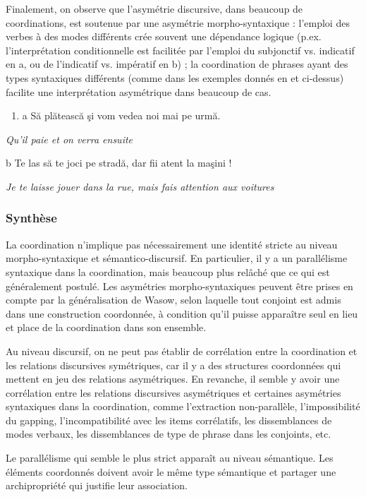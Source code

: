 Finalement, on observe que l'asymétrie discursive, dans beaucoup de coordinations, est soutenue par une asymétrie morpho-syntaxique : l'emploi des verbes à des modes différents crée souvent une dépendance logique (p.ex. l'interprétation conditionnelle est facilitée par l'emploi du subjonctif vs. indicatif en a, ou de l'indicatif vs. impératif en b) ; la coordination de phrases ayant des types syntaxiques différents (comme dans les exemples donnés en  et  ci-dessus) facilite une interprétation asymétrique dans beaucoup de cas. 


\begin{enumerate}
\item \label{bkm:Ref273392770}a  Să plătească şi vom vedea noi mai pe urmă.


\end{enumerate}
{\itshape
Qu'il paie et on verra ensuite}

  b  Te las să te joci pe stradă, dar fii atent la maşini !

    \textit{Je te laisse jouer dans la rue, mais fais attention aux voitures}

\subsubsection{Synthèse}
\label{bkm:Ref302036956}La coordination n'implique pas nécessairement une identité stricte au niveau morpho-syntaxique et sémantico-discursif. En particulier, il y a un parallélisme syntaxique dans la coordination, mais beaucoup plus relâché que ce qui est généralement postulé. Les asymétries morpho-syntaxiques peuvent être prises en compte par la généralisation de Wasow, selon laquelle tout conjoint est admis dans une construction coordonnée, à condition qu'il puisse apparaître seul en lieu et place de la coordination dans son ensemble.

Au niveau discursif, on ne peut pas établir de corrélation entre la coordination et les relations discursives symétriques, car il y a des structures coordonnées qui mettent en jeu des relations asymétriques. En revanche, il semble y avoir une corrélation entre les relations discursives asymétriques et certaines asymétries syntaxiques dans la coordination, comme l'extraction non-parallèle, l'impossibilité du gapping, l'incompatibilité avec les items corrélatifs, les dissemblances de modes verbaux, les dissemblances de type de phrase dans les conjoints, etc. 

Le parallélisme qui semble le plus strict apparaît au niveau sémantique. Les éléments coordonnés doivent avoir le même type sémantique et partager une archipropriété qui justifie leur association.


